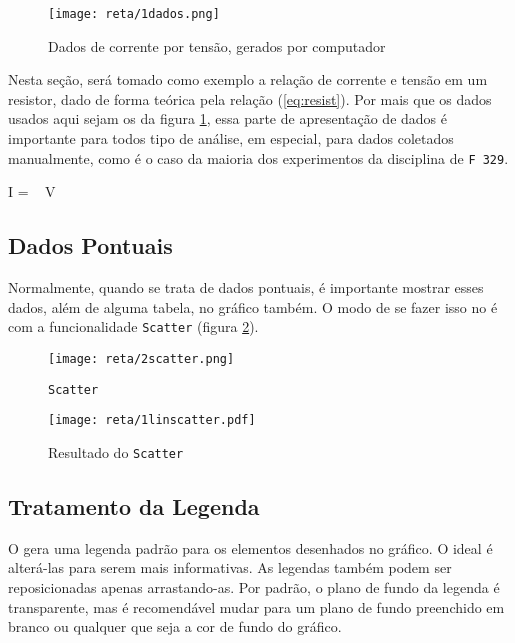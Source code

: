 \begin{figure}[htbp]
    \centering
    \texttt{[image: reta/1dados.png]}

    \caption{Dados de corrente por tensão, gerados por computador}
    \label{fig:reta:dados}
\end{figure}

Nesta seção, será tomado como exemplo a relação de corrente e tensão em um resistor, dado de forma teórica pela relação (\ref{eq:resist}). Por mais que os dados usados aqui sejam os da figura \ref{fig:reta:dados}, essa parte de apresentação de dados é importante para todos tipo de análise, em especial, para dados coletados manualmente, como é o caso da maioria dos experimentos da disciplina de \texttt{F 329}.

\begin{equacao} \label{eq:resist}
    I =  ~ V
\end{equacao}


\subsection{Dados Pontuais}

    Normalmente, quando se trata de dados pontuais, é importante mostrar esses dados, além de alguma tabela, no gráfico também. O modo de se fazer isso no \software é com a funcionalidade \texttt{Scatter} (figura \ref{fig:reta:scatter}).

    \begin{figure}[htbp]
        \centering
        \texttt{[image: reta/2scatter.png]}

        \caption{\texttt{Scatter}}
        \label{fig:reta:scatter}
    \end{figure}

    \begin{figure}[htbp]
        \centering
        \texttt{[image: reta/1linscatter.pdf]}

        \caption{Resultado do \texttt{Scatter}}
        \label{fig:reta:linscatter}
    \end{figure}


\subsection{Tratamento da Legenda}

    O \software gera uma legenda padrão para os elementos desenhados no gráfico. O ideal é alterá-las para serem mais informativas. As legendas também podem ser reposicionadas apenas arrastando-as. Por padrão, o plano de fundo da legenda é transparente, mas é recomendável mudar para um plano de fundo preenchido em branco ou qualquer que seja a cor de fundo do gráfico.

